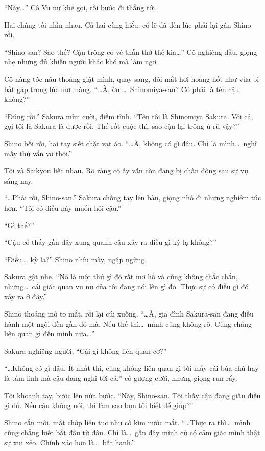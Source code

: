 \documentclass[../main.tex]{subfiles}
\begin{document}
``Này\dots'' Cô Vu nữ khẽ gọi, rồi bước đi thẳng tới.

Hai chúng tôi nhìn nhau. Cả hai cùng hiểu: có lẽ đã đến lúc phải lại gần Shino rồi.

``Shino-san? Sao thế? Cậu trông có vẻ thẫn thờ thế kia\dots'' Cô nghiêng đầu, giọng nhẹ nhưng đủ khiến người khác khó mà làm ngơ.

Cô nàng tóc nâu thoáng giật mình, quay sang, đôi mắt hơi hoảng hốt như vừa bị bắt gặp trong lúc mơ màng. ``\dots À, ờm\dots\ Shinomiya-san? Có phải là tên cậu không?''

``Đúng rồi.'' Sakura mỉm cười, điềm tĩnh. ``Tên tôi là Shinomiya Sakura. Với cả, gọi tôi là Sakura là được rồi. Thế rốt cuộc thì, sao cậu lại trông ủ rũ vậy?''

Shino bối rối, hai tay siết chặt vạt áo. ``\dots À, không có gì đâu. Chỉ là mình\dots\ nghĩ mấy thứ vẩn vơ thôi.''

Tôi và Saikyou liếc nhau. Rõ ràng cô ấy vẫn còn đang bị chấn động sau sự vụ sáng nay.

``\dots Phải rồi, Shino-san.'' Sakura chống tay lên bàn, giọng nhỏ đi nhưng nghiêm túc hơn. ``Tôi có điều này muốn hỏi cậu.''

``Gì thế?''

``Cậu có thấy gần đây xung quanh cậu xảy ra điều gì kỳ lạ không?''

``Điều\dots\ kỳ lạ?'' Shino nhíu mày, ngập ngừng.

Sakura gật nhẹ. ``Nó là một thứ gì đó rất mơ hồ và cũng không chắc chắn, nhưng\dots\ cái giác quan vu nữ của tôi đang nói lên gì đó. Thực sự có điều gì đó xảy ra ở đây.''

Shino thoáng mở to mắt, rồi lại cúi xuống. ``\dots À, gia đình Sakura-san đang điều hành một ngôi đền gần đó mà. Nếu thế thì\dots\ mình cũng không rõ. Cũng chẳng liên quan gì đến mình nữa\dots ''

Sakura nghiêng người. ``Cái gì không liên quan cơ?''

``\dots Không có gì đâu. Ít nhất thì, cũng không liên quan gì tới mấy cái bùa chú hay là tâm linh mà cậu đang nghĩ tới cả,'' cô gượng cười, nhưng giọng run rẩy.

Tôi khoanh tay, bước lên nửa bước. ``Này, Shino-san. Tôi thấy cậu đang giấu điều gì đó. Nếu cậu không nói, thì làm sao bọn tôi biết để giúp?''

Shino cắn môi, mắt chớp liên tục như cố kìm nước mắt. ``\dots Thực ra thì\dots\ mình cũng chẳng biết bắt đầu từ đâu. Chỉ là\dots\ gần đây mình cứ có cảm giác mình thật sự xui xẻo. Chính xác hơn là\dots\ bất hạnh.''
\end{document}
